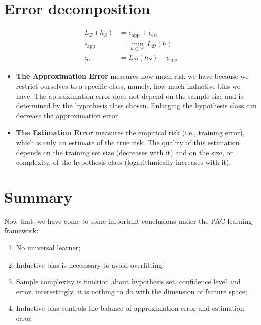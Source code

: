 \documentclass{article}
\begin{document}
\section{Error decomposition}

	\begin{equation}
	\begin{split}
	L_\mathcal{D}(h_S) &= \epsilon_{\mathrm{app}}+\epsilon_{\mathrm{est}} \\
	\epsilon_{\mathrm{app}} &= \min\limits_{h\in\mathcal{H}}L_\mathcal{D}(h) \\
	\epsilon_{\mathrm{est}} &= L_\mathcal{D}(h_S)-\epsilon_{\mathrm{app}}
	\end{split}
	\end{equation}		

	\begin{itemize}
	\item \textbf{The Approximation Error} measures how much risk we have because we restrict ourselves to a specific class, namely, how much inductive bias we have. The approximation error does not depend on the sample size and is determined by the hypothesis class chosen. Enlarging the hypothesis class can decrease the approximation error.
	\item \textbf{The Estimation Error} measures the empirical risk (i.e., training error), which is only an estimate of the true risk. The quality of this estimation depends on the training set size (decreases with it) and on the size, or complexity, of the hypothesis class (logarithmically increases with it).
	\end{itemize}

\section{Summary}

Now that, we have come to some important conclusions under the PAC learning framework:

\begin{enumerate}
\item No universal learner;
\item Inductive bias is neccessary to avoid overfitting;
\item Sample complexity is function about hypothesis set, confidence level and error, interestingly, it is nothing to do with the dimension of feature space;
\item Inductive bias controls the balance of approximation error and estimation error.
\end{enumerate}
\end{document}
